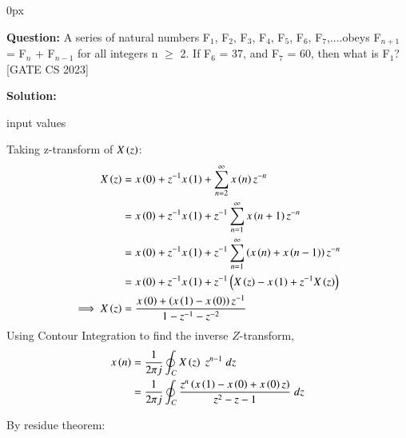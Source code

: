 \documentclass[journal,12pt,onecolumn]{IEEEtran}
\begin{document}
	\parindent 0px
	
	

	
	\title{}
	\author{EE23BTECH11209 - K S Ballvardhan$^{*}$
	}
	\maketitle
	\bigskip
	
	
	
	
	
	\textbf{Question:} A series of natural numbers F$_1$, F$_2$, F$_3$, F$_4$, F$_5$, F$_6$, F$_7$,....obeys F$_{n+1}$ = F$_n$ + F$_{n-1}$ for all integers n $\geq$ 2.
	If F$_6$ = 37, and F$_7$ = 60, then what is F$_1$? \hfill[GATE CS 2023]
	
	\textbf{Solution: }
	
	\begin{table}[ht] 
		\centering
		
		\caption{input values}
		\label{tab: Table2023cs3}
	\end{table}
	
    Taking z-transform of $X\left(z\right)$:
	\begin{align}
		X\left(z\right) &= x\left(0\right) + z^{-1} x\left(1\right) + \sum_{n=2}^{\infty} x\left(n\right) z^{-n}\\
	    &= x\left(0\right) + z^{-1} x\left(1\right) + z^{-1} \sum_{n=1}^{\infty} x\left(n+1\right) z^{-n}\\
	    &= x\left(0\right) + z^{-1} x\left(1\right) + z^{-1} \sum_{n=1}^{\infty} \left(x\left(n\right) + x\left(n-1\right)\right)z^{-n} \\
	    &= x\left(0\right) + z^{-1} x\left(1\right) + z^{-1}\left(X\left(z\right)-x\left(1\right) + z^{-1}X\left(z\right)\right) \\
		\implies X\left(z\right)&= \frac{x\left(0\right) + \left(x\left(1\right)-x\left(0\right)\right)z^{-1}}{1-z^{-1}-z^{-2}}
	\end{align}
	Using Contour Integration to find the inverse $Z$-transform,
	\begin{align}
		x\left(n\right) &=\frac{1}{2\pi j}\oint_{C} X\left(z\right) \;z^{n-1} \;dz  \\
		&=\frac{1}{2\pi j}\oint_{C}\frac{z^{n}\left(x\left(1\right)-x\left(0\right)+x\left(0\right) z\right)}{z^2-z-1} \;dz 
	\end{align}
	
	By residue theorem:
	
\end{document}
